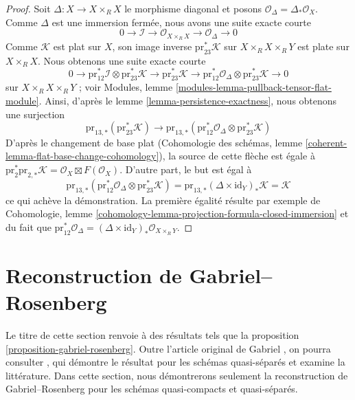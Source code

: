 \begin{proof}
Soit $\Delta : X \to X \times_R X$ le morphisme diagonal et
posons $\mathcal{O}_\Delta = \Delta_*\mathcal{O}_X$.
Comme $\Delta$ est une immersion fermée, nous avons une suite exacte courte
$$
0 \to \mathcal{I} \to 
\mathcal{O}_{X \times_R X} \to \mathcal{O}_\Delta \to 0
$$
Comme $\mathcal{K}$ est plat sur $X$, son image inverse
$\text{pr}_{23}^*\mathcal{K}$ sur $X \times_R X \times_R Y$
est plate sur $X \times_R X$. Nous obtenons une suite exacte courte
$$
0 \to 
\text{pr}_{12}^*\mathcal{I}
\otimes
\text{pr}_{23}^*\mathcal{K} \to
\text{pr}_{23}^*\mathcal{K} \to
\text{pr}_{12}^*\mathcal{O}_\Delta
\otimes
\text{pr}_{23}^*\mathcal{K} \to 0
$$
sur $X \times_R X \times_R Y$ ; voir
Modules, lemme \ref{modules-lemma-pullback-tensor-flat-module}.
Ainsi, d'après le lemme \ref{lemma-persistence-exactness},
nous obtenons une surjection
$$
\text{pr}_{13, *}(\text{pr}_{23}^*\mathcal{K})
\to
\text{pr}_{13, *}(
\text{pr}_{12}^*\mathcal{O}_\Delta
\otimes
\text{pr}_{23}^*\mathcal{K})
$$
D'après le changement de base plat (Cohomologie des schémas, lemme
\ref{coherent-lemma-flat-base-change-cohomology}), la source de cette flèche
est égale à $\text{pr}_2^*\text{pr}_{2, *}\mathcal{K}
= \mathcal{O}_X \boxtimes F(\mathcal{O}_X)$. D'autre part, le but est
égal à
$$
\text{pr}_{13, *}(
\text{pr}_{12}^*\mathcal{O}_\Delta
\otimes
\text{pr}_{23}^*\mathcal{K}) =
\text{pr}_{13, *} (\Delta \times \text{id}_Y)_* \mathcal{K} =
\mathcal{K}
$$
ce qui achève la démonstration. La première égalité résulte par exemple de
Cohomologie, lemme \ref{cohomology-lemma-projection-formula-closed-immersion}
et du fait que $\text{pr}_{12}^*\mathcal{O}_\Delta =
(\Delta \times \text{id}_Y)_*\mathcal{O}_{X \times_R Y}$.
\end{proof}









\section{Reconstruction de Gabriel--Rosenberg}
\label{section-gabriel}

\noindent
Le titre de cette section renvoie à des résultats tels que la
proposition \ref{proposition-gabriel-rosenberg}.
Outre l'article original de Gabriel \cite{Gabriel}, on pourra consulter
\cite{Brandenburg}, qui démontre le résultat pour les schémas quasi-séparés
et examine la littérature. Dans cette section, nous démontrerons seulement
la reconstruction de Gabriel--Rosenberg pour les schémas quasi-compacts et
quasi-séparés.

